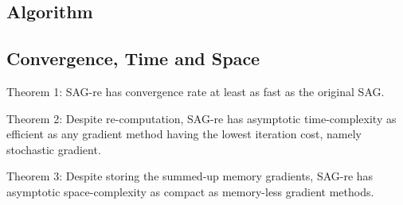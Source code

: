 \subsection{Algorithm}

\subsection{Convergence, Time and Space}
Theorem 1: SAG-re has convergence rate at least as fast as the original SAG.

Theorem 2: Despite re-computation, SAG-re has asymptotic time-complexity as efficient as any gradient method having the lowest iteration cost, namely stochastic gradient.

Theorem 3: Despite storing the summed-up memory gradients, SAG-re has asymptotic space-complexity as compact as memory-less gradient methods.

